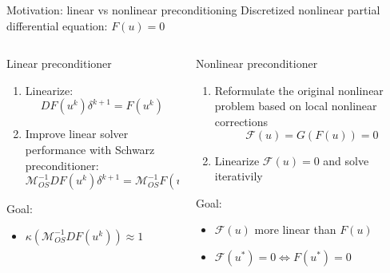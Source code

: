 \begin{frame}[noframenumbering]{Motivation: linear vs nonlinear preconditioning}
	Discretized nonlinear partial differential equation: $F(u) = 0$
	\begin{columns}
		\begin{column}{0.5\textwidth}
			\vspace*{-4mm}
			\begin{block}{\normalsize Linear preconditioner}
				\begin{enumerate}
					\item Linearize:
					      \begin{equation*}
						      DF(u^k)\delta^{k+1} = F(u^k)
					      \end{equation*}
					\item Improve linear solver performance with Schwarz preconditioner:
					      \begin{equation*}
						      \mathcal{M}_{OS}^{-1}DF(u^k)\delta^{k+1} = \mathcal{M}_{OS}^{-1}F(u^k)
					      \end{equation*}
				\end{enumerate}
				\vspace*{4mm}
				Goal:
				\begin{itemize}
					\item $\kappa(\mathcal{M}_{OS}^{-1}DF(u^k)) \approx 1$
				\end{itemize}
			\end{block}
		\end{column}
		\begin{column}{0.5\textwidth}
			\vspace*{-4mm}
			\begin{block}{\normalsize Nonlinear preconditioner}
				\begin{enumerate}
					\item Reformulate the original nonlinear problem based on local nonlinear corrections
					      \begin{equation}
						      \mathcal{F}(u) = G(F(u)) = 0
					      \end{equation}
					\item Linearize $\mathcal{F}(u) = 0$ and solve iterativily
				\end{enumerate}
				Goal:
				\begin{itemize}
					\item $\mathcal{F}(u)$ more linear than $F(u)$
					\item $\mathcal{F}(u^*) = 0 \iff F(u^*) = 0$
				\end{itemize}
			\end{block}
		\end{column}
	\end{columns}

\end{frame}

